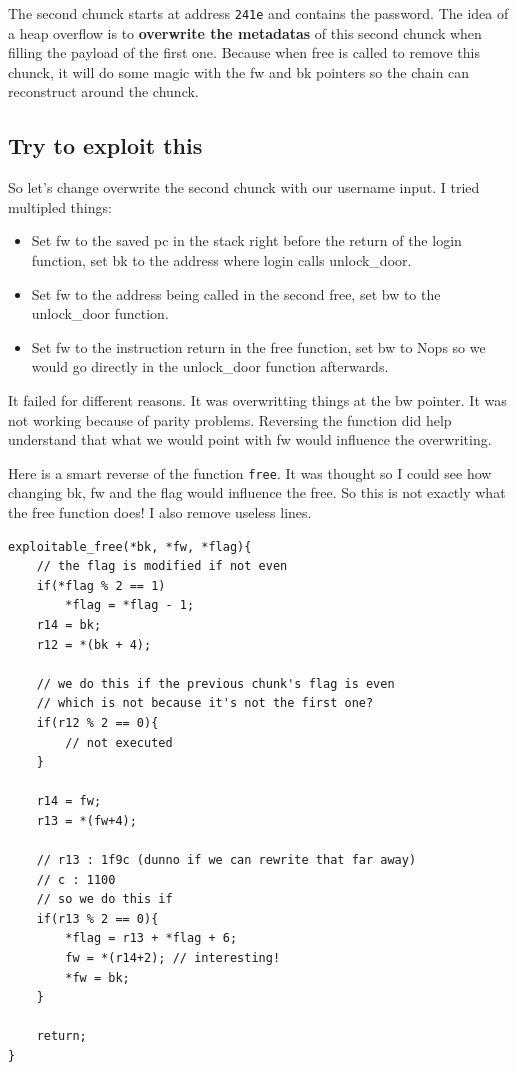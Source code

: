 \documentclass[a4paper,11pt]{article}
\begin{document}
The second chunck starts at address \texttt{241e} and contains the
password. The idea of a heap overflow is to \textbf{overwrite the
metadatas} of this second chunck when filling the payload of the first
one. Because when free is called to remove this chunck, it will do some
magic with the fw and bk pointers so the chain can reconstruct around
the chunck.

\subsection{Try to exploit this}\label{try-to-exploit-this}

So let's change overwrite the second chunck with our username input. I
tried multipled things:

\begin{itemize}
\itemsep1pt\parskip0pt
\item
  Set fw to the saved pc in the stack right before the return of the
  login function, set bk to the address where login calls unlock\_door.
\item
  Set fw to the address being called in the second free, set bw to the
  unlock\_door function.
\item
  Set fw to the instruction return in the free function, set bw to Nops
  so we would go directly in the unlock\_door function afterwards.
\end{itemize}

It failed for different reasons. It was overwritting things at the bw
pointer. It was not working because of parity problems. Reversing the
function did help understand that what we would point with fw would
influence the overwriting.

Here is a smart reverse of the function \texttt{free}. It was thought so
I could see how changing bk, fw and the flag would influence the free.
So this is not exactly what the free function does! I also remove
useless lines.

\begin{verbatim}
exploitable_free(*bk, *fw, *flag){
    // the flag is modified if not even
    if(*flag % 2 == 1)
        *flag = *flag - 1;
    r14 = bk;
    r12 = *(bk + 4);

    // we do this if the previous chunk's flag is even
    // which is not because it's not the first one?
    if(r12 % 2 == 0){
        // not executed
    }

    r14 = fw;
    r13 = *(fw+4);

    // r13 : 1f9c (dunno if we can rewrite that far away)
    // c : 1100
    // so we do this if
    if(r13 % 2 == 0){
        *flag = r13 + *flag + 6;
        fw = *(r14+2); // interesting!
        *fw = bk;
    }

    return;
}
\end{verbatim}
\end{document}
